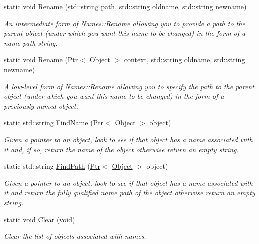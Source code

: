 \begin{DoxyCompactItemize}
static void \hyperlink{classns3_1_1Names_a8e7b8a3e5e9423ef8c61d6ad216ca81c}{Rename} (std\+::string path, std\+::string oldname, std\+::string newname)
\begin{DoxyCompactList}\small\item\em An intermediate form of \hyperlink{classns3_1_1Names_a0ed4aa6358357bef3930cd19ba306373}{Names\+::\+Rename} allowing you to provide a path to the parent object (under which you want this name to be changed) in the form of a name path string. \end{DoxyCompactList}\item 
static void \hyperlink{classns3_1_1Names_ad6474f8c16e99575397c5c243a3f9aa4}{Rename} (\hyperlink{classns3_1_1Ptr}{Ptr}$<$ \hyperlink{classns3_1_1Object}{Object} $>$ context, std\+::string oldname, std\+::string newname)
\begin{DoxyCompactList}\small\item\em A low-\/level form of \hyperlink{classns3_1_1Names_a0ed4aa6358357bef3930cd19ba306373}{Names\+::\+Rename} allowing you to specify the path to the parent object (under which you want this name to be changed) in the form of a previously named object. \end{DoxyCompactList}\item 
static std\+::string \hyperlink{classns3_1_1Names_ab9664faf23569aaae64a2d1f65265045}{Find\+Name} (\hyperlink{classns3_1_1Ptr}{Ptr}$<$ \hyperlink{classns3_1_1Object}{Object} $>$ object)
\begin{DoxyCompactList}\small\item\em Given a pointer to an object, look to see if that object has a name associated with it and, if so, return the name of the object otherwise return an empty string. \end{DoxyCompactList}\item 
static std\+::string \hyperlink{classns3_1_1Names_af72bee5ceb8c2592ef37063311501498}{Find\+Path} (\hyperlink{classns3_1_1Ptr}{Ptr}$<$ \hyperlink{classns3_1_1Object}{Object} $>$ object)
\begin{DoxyCompactList}\small\item\em Given a pointer to an object, look to see if that object has a name associated with it and return the fully qualified name path of the object otherwise return an empty string. \end{DoxyCompactList}\item 
static void \hyperlink{classns3_1_1Names_abda77642452c3e4a4ad8a76491dd2538}{Clear} (void)
\begin{DoxyCompactList}\small\item\em Clear the list of objects associated with names. \end{DoxyCompactList}\item 

\end{DoxyCompactItemize}
